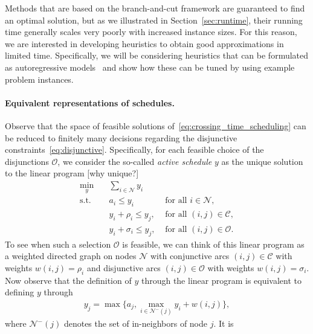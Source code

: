 \documentclass[a4paper]{report}
\theoremstyle{definition}
\theoremstyle{plain}
\newcommand\note[1]{{\color{Navy}#1}}
\begin{document}
Methods that are based on the branch-and-cut framework are guaranteed to find an
optimal solution, but as we illustrated in Section~\ref{sec:runtime}, their running time
generally scales very poorly with increased instance sizes. For this reason, we
are interested in developing heuristics to obtain good approximations in limited
time.
%
Specifically, we will be considering heuristics that can be formulated as
autoregressive models~\cite{tomczakDeepGenerativeModeling2024} and show how these can be tuned by using example
problem instances.

\paragraph{Equivalent representations of schedules.}
Observe that the space of feasible solutions of~\eqref{eq:crossing_time_scheduling} can be reduced to finitely
many decisions regarding the disjunctive constraints~\eqref{eq:disjunctive}. Specifically, for each
feasible choice of the disjunctions $\mathcal{O}$, we consider the so-called
\textit{active schedule} $y$ as the unique solution to the linear program
\note{[why unique?]}
\begin{subequations}
  \label{eq:active_schedule}
\begin{align}
  \min_{y} \quad & \sum_{i \in \mathcal{N}} y_{i} \\
  \text{s.t.} \quad & a_{i} \leq y_{i} & \text{ for all } i \in \mathcal{N}, \\
           & y_{i} + \rho_{i} \leq y_{j}, & \text{ for all } (i,j) \in \mathcal{C}, \\
           & y_{i} + \sigma_{i} \leq y_{j}, & \text{ for all } (i,j) \in \mathcal{O} .
\end{align}
\end{subequations}
To see when such a selection $\mathcal{O}$ is feasible, we can think of this
linear program as a weighted directed graph on nodes $\mathcal{N}$ with
conjunctive arcs $(i,j) \in \mathcal{C}$ with weights $w(i,j) = \rho_{i}$ and
disjunctive arcs $(i,j) \in \mathcal{O}$ with weights $w(i,j) = \sigma_{i}$. Now
observe that the definition of $y$ through the linear program is equivalent to
defining $y$ through
\begin{align}
  \label{eq:y_max}
  y_{j} = \max\{ a_{j}, \max_{i \in \mathcal{N}^{-}(j)} y_i + w(i,j) \} ,
\end{align}
where $\mathcal{N}^{-}(j)$ denotes the set of in-neighbors of node $j$. It is
\end{document}
